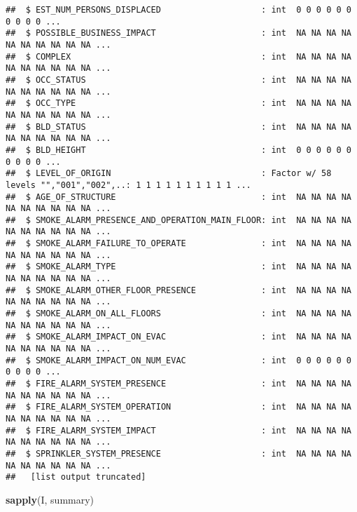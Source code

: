 \documentclass[]{article}
\newenvironment{Shaded}{\begin{snugshade}}{\end{snugshade}}
\newcommand{\KeywordTok}[1]{\textcolor[rgb]{0.13,0.29,0.53}{\textbf{#1}}}
\newcommand{\NormalTok}[1]{#1}
\begin{document}
\begin{verbatim}
##  $ EST_NUM_PERSONS_DISPLACED                    : int  0 0 0 0 0 0 0 0 0 0 ...
##  $ POSSIBLE_BUSINESS_IMPACT                     : int  NA NA NA NA NA NA NA NA NA NA ...
##  $ COMPLEX                                      : int  NA NA NA NA NA NA NA NA NA NA ...
##  $ OCC_STATUS                                   : int  NA NA NA NA NA NA NA NA NA NA ...
##  $ OCC_TYPE                                     : int  NA NA NA NA NA NA NA NA NA NA ...
##  $ BLD_STATUS                                   : int  NA NA NA NA NA NA NA NA NA NA ...
##  $ BLD_HEIGHT                                   : int  0 0 0 0 0 0 0 0 0 0 ...
##  $ LEVEL_OF_ORIGIN                              : Factor w/ 58 levels "","001","002",..: 1 1 1 1 1 1 1 1 1 1 ...
##  $ AGE_OF_STRUCTURE                             : int  NA NA NA NA NA NA NA NA NA NA ...
##  $ SMOKE_ALARM_PRESENCE_AND_OPERATION_MAIN_FLOOR: int  NA NA NA NA NA NA NA NA NA NA ...
##  $ SMOKE_ALARM_FAILURE_TO_OPERATE               : int  NA NA NA NA NA NA NA NA NA NA ...
##  $ SMOKE_ALARM_TYPE                             : int  NA NA NA NA NA NA NA NA NA NA ...
##  $ SMOKE_ALARM_OTHER_FLOOR_PRESENCE             : int  NA NA NA NA NA NA NA NA NA NA ...
##  $ SMOKE_ALARM_ON_ALL_FLOORS                    : int  NA NA NA NA NA NA NA NA NA NA ...
##  $ SMOKE_ALARM_IMPACT_ON_EVAC                   : int  NA NA NA NA NA NA NA NA NA NA ...
##  $ SMOKE_ALARM_IMPACT_ON_NUM_EVAC               : int  0 0 0 0 0 0 0 0 0 0 ...
##  $ FIRE_ALARM_SYSTEM_PRESENCE                   : int  NA NA NA NA NA NA NA NA NA NA ...
##  $ FIRE_ALARM_SYSTEM_OPERATION                  : int  NA NA NA NA NA NA NA NA NA NA ...
##  $ FIRE_ALARM_SYSTEM_IMPACT                     : int  NA NA NA NA NA NA NA NA NA NA ...
##  $ SPRINKLER_SYSTEM_PRESENCE                    : int  NA NA NA NA NA NA NA NA NA NA ...
##   [list output truncated]
\end{verbatim}

\begin{Shaded}
\begin{Highlighting}[]
\KeywordTok{sapply}\NormalTok{(I, summary)}
\end{Highlighting}
\end{Shaded}
\end{document}
